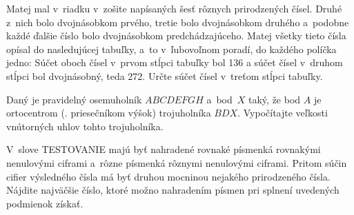 {%
Matej mal v~riadku v~zošite napísaných šesť rôznych prirodzených čísel. Druhé z~nich
bolo dvojnásobkom prvého, tretie bolo dvojnásobkom druhého a~podobne každé ďalšie
číslo bolo dvojnásobkom predchádzajúceho. Matej všetky tieto čísla opísal do nasledujúcej
tabuľky, a~to v~ľubovoľnom poradí, do každého políčka jedno:
Súčet oboch čísel v~prvom stĺpci tabuľky bol 136 a súčet čísel v~druhom stĺpci
bol dvojnásobný, teda 272. Určte súčet čísel v~treťom stĺpci tabuľky.}

{%
Daný je pravidelný osemuholník $ABCDEFGH$ a~bod~$X$ taký, že bod $A$ je ortocentrom
(\tj. priesečníkom výšok) trojuholníka $BDX$. Vypočítajte veľkosti vnútorných uhlov tohto
trojuholníka.}

{%
V~slove TESTOVANIE majú byť nahradené rovnaké písmenká rovnakými nenulovými
ciframi a~rôzne písmenká rôznymi nenulovými ciframi.
Pritom súčin cifier výsledného čísla má byť druhou mocninou
nejakého prirodzeného čísla.
Nájdite najväčšie číslo, ktoré možno nahradením písmen pri splnení uvedených podmienok získať.
}

